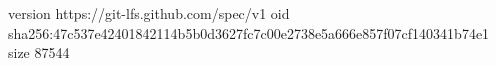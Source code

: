 version https://git-lfs.github.com/spec/v1
oid sha256:47c537e42401842114b5b0d3627fc7c00e2738e5a666e857f07cf140341b74e1
size 87544
